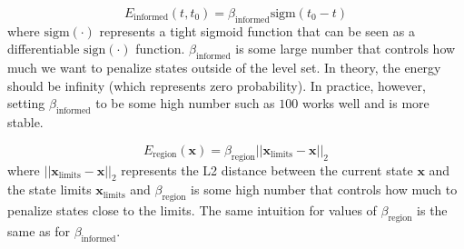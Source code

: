 \documentclass[letterpaper, 10 pt, conference]{ieeeconf}  %
\begin{document}
{\begin{equation}
E_{\text{informed}}\left(t,t_0\right) = \beta_{\text{informed}} \text{sigm}\left(t_0 - t\right)
\end{equation}
where $\text{sigm}\left(\cdot\right)$ represents a tight sigmoid function that can be seen as a differentiable $\text{sign}\left(\cdot\right)$ function. $\beta_{\text{informed}}$ is some large number that controls how much we want to penalize states outside of the level set. In theory, the energy should be infinity (which represents zero probability). In practice, however, setting $\beta_{\text{informed}}$ to be some high number such as $100$ works well and is more stable.

\begin{equation}
E_{\text{region}}\left(\mathbf{x}\right) = \beta_{\text{region}}||\mathbf{x}_{\text{limits}} - \mathbf{x}||_2
\end{equation}
where $||\mathbf{x}_{\text{limits}} - \mathbf{x}||_2$ represents the L2 distance between the current state $\mathbf{x}$ and the state limits $\mathbf{x}_{\text{limits}}$ and $\beta_{\text{region}}$ is some high number that controls how much to penalize states close to the limits. The same intuition for values of $\beta_{\text{region}}$ is the same as for $\beta_{\text{informed}}$.

}








%
\end{document}
